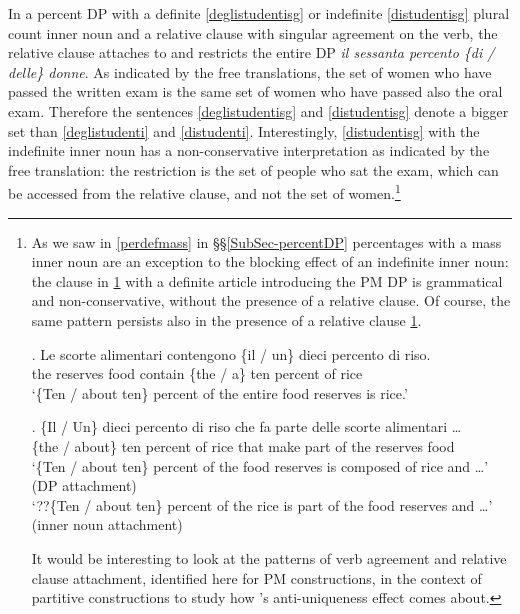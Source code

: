 \documentclass[charis, linguex]{glossa}
\newcommand{\citesax}[1]{\citeauthor{#1}'s \citeyearpar{#1}}
\begin{document}
In a percent DP with a definite \ref{deglistudentisg} or indefinite \ref{distudentisg} plural count inner noun and a relative clause with singular agreement on the  verb, the relative clause attaches to and restricts the entire DP \textit{il sessanta percento \{di / delle\} donne}. As indicated by the free translations, the set of women who have passed the written exam is the same set of women who have passed also the oral exam. Therefore the sentences \ref{deglistudentisg} and \ref{distudentisg} denote a bigger set than \ref{deglistudenti} and \ref{distudenti}. Interestingly, \ref{distudentisg} with the indefinite inner noun has a non-conservative interpretation as indicated by the free translation: the restriction is the set of people who sat the exam, which can be accessed from the relative clause, and not the set of women.\footnote{As we saw in \ref{perdefmass} in \S\S\ref{SubSec-percentDP} percentages with a mass inner noun are an exception to the blocking effect of an indefinite inner noun: the clause in \ref{nonrel} with a definite article introducing the PM DP is grammatical and non-conservative, without the presence of a relative clause. Of course, the same pattern persists also in the presence of a relative clause \ref{relclausemass}.  

\exg. Le scorte alimentari contengono \{il / un\} dieci percento di riso.  \\
      the reserves food contain \{the / a\} ten percent of rice \\
	\glt   `\{Ten / about ten\} percent of the entire food reserves is rice.'  \label{nonrel}

\exg. \{Il / Un\} dieci percento di riso che fa parte delle scorte alimentari \ldots \\
      \{the / about\} ten percent of rice that make part {of the} reserves food \\
	\glt  `\{Ten / about ten\} percent of the food reserves is composed of rice and \ldots'  (DP attachment) \\
	`??\{Ten / about ten\}  percent of the rice is part of the food reserves and \ldots' (inner noun attachment)\label{relclausemass}
	
	It would be interesting to look at the  patterns of verb agreement and relative clause attachment, identified here for PM constructions, in the context of partitive constructions to study how \citesax{bar98} anti-uniqueness effect comes about.
	}
	  
\end{document}
